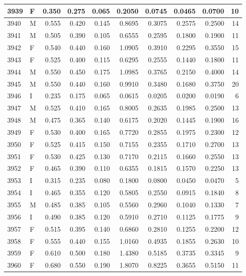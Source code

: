 \documentclass[9pt,twocolumn,twoside,]{pnas-new}
\begin{document}
\begin{tabular}{l|l|r|r|r|r|r|r|r|r}
\hline
3939 & F & 0.350 & 0.275 & 0.065 & 0.2050 & 0.0745 & 0.0465 & 0.0700 & 10\\
\hline
3940 & M & 0.555 & 0.420 & 0.145 & 0.8695 & 0.3075 & 0.2575 & 0.2500 & 14\\
\hline
3941 & M & 0.505 & 0.390 & 0.105 & 0.6555 & 0.2595 & 0.1800 & 0.1900 & 11\\
\hline
3942 & F & 0.540 & 0.440 & 0.160 & 1.0905 & 0.3910 & 0.2295 & 0.3550 & 15\\
\hline
3943 & F & 0.525 & 0.400 & 0.115 & 0.6295 & 0.2555 & 0.1440 & 0.1800 & 11\\
\hline
3944 & M & 0.550 & 0.450 & 0.175 & 1.0985 & 0.3765 & 0.2150 & 0.4000 & 14\\
\hline
3945 & M & 0.550 & 0.440 & 0.160 & 0.9910 & 0.3480 & 0.1680 & 0.3750 & 20\\
\hline
3946 & I & 0.235 & 0.175 & 0.065 & 0.0615 & 0.0205 & 0.0200 & 0.0190 & 6\\
\hline
3947 & M & 0.525 & 0.410 & 0.165 & 0.8005 & 0.2635 & 0.1985 & 0.2500 & 13\\
\hline
3948 & M & 0.475 & 0.365 & 0.140 & 0.6175 & 0.2020 & 0.1445 & 0.1900 & 16\\
\hline
3949 & F & 0.530 & 0.400 & 0.165 & 0.7720 & 0.2855 & 0.1975 & 0.2300 & 12\\
\hline
3950 & F & 0.525 & 0.415 & 0.150 & 0.7155 & 0.2355 & 0.1710 & 0.2700 & 13\\
\hline
3951 & F & 0.530 & 0.425 & 0.130 & 0.7170 & 0.2115 & 0.1660 & 0.2550 & 13\\
\hline
3952 & F & 0.465 & 0.390 & 0.110 & 0.6355 & 0.1815 & 0.1570 & 0.2250 & 13\\
\hline
3953 & I & 0.315 & 0.235 & 0.080 & 0.1800 & 0.0800 & 0.0450 & 0.0470 & 5\\
\hline
3954 & I & 0.465 & 0.355 & 0.120 & 0.5805 & 0.2550 & 0.0915 & 0.1840 & 8\\
\hline
3955 & M & 0.485 & 0.385 & 0.105 & 0.5560 & 0.2960 & 0.1040 & 0.1330 & 7\\
\hline
3956 & I & 0.490 & 0.385 & 0.120 & 0.5910 & 0.2710 & 0.1125 & 0.1775 & 9\\
\hline
3957 & F & 0.515 & 0.395 & 0.140 & 0.6860 & 0.2810 & 0.1255 & 0.2200 & 12\\
\hline
3958 & F & 0.555 & 0.440 & 0.155 & 1.0160 & 0.4935 & 0.1855 & 0.2630 & 10\\
\hline
3959 & F & 0.610 & 0.500 & 0.180 & 1.4380 & 0.5185 & 0.3735 & 0.3345 & 9\\
\hline
3960 & F & 0.680 & 0.550 & 0.190 & 1.8070 & 0.8225 & 0.3655 & 0.5150 & 11\\

\end{tabular}
\end{document}
